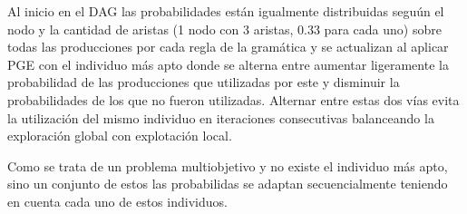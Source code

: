 Al inicio en el DAG las probabilidades est\'an igualmente distribuidas segu\'un el nodo y la cantidad de aristas (1 nodo con 3 aristas, 0.33 para cada uno) sobre todas las producciones por cada regla de la gram\'atica y se actualizan al aplicar PGE con el individuo m\'as apto donde se alterna entre aumentar ligeramente la probabilidad de las producciones que utilizadas por este y disminuir la probabilidades de los que no fueron utilizadas. Alternar entre estas dos v\'ias evita la utilizaci\'on del mismo individuo en iteraciones consecutivas balanceando la exploraci\'on global con explotaci\'on local.

Como se trata de un problema multiobjetivo y no existe el individuo m\'as apto, sino un conjunto de estos las probabilidas se adaptan secuencialmente teniendo en cuenta cada uno de estos individuos.
